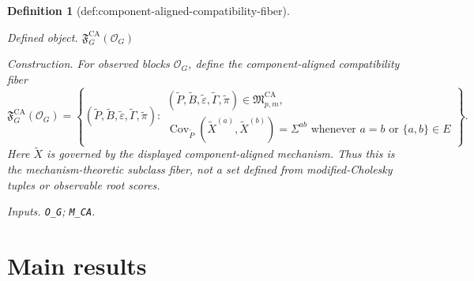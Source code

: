 \documentclass{article}
\newtheorem{definition}{Definition}
\begin{document}
\begin{definition}[def:component-aligned-compatibility-fiber]\label{def:component-aligned-compatibility-fiber}
\par\smallskip\noindent\emph{Defined object.} \(\mathfrak F_G^{\mathrm{CA}}(\mathcal O_G)\)
\par\smallskip\noindent\emph{Construction.} For observed blocks \(\mathcal O_G\), define the component-aligned compatibility fiber
\[
 \mathfrak F_G^{\mathrm{CA}}(\mathcal O_G)
 =\left\{(\widetilde P,\widetilde B,\widetilde\varepsilon,
 \widetilde\Gamma,\widetilde\pi):
 \begin{array}{l}
 (\widetilde P,\widetilde B,\widetilde\varepsilon,
 \widetilde\Gamma,\widetilde\pi)
 \in\mathfrak M_{p,m}^{\mathrm{CA}},\\
 \operatorname{Cov}_{\widetilde P}(\widetilde X^{(a)},
 \widetilde X^{(b)})=\Sigma^{ab}
 \text{ whenever }a=b\text{ or }\{a,b\}\in E
 \end{array}\right\}.
\]
Here \(\widetilde X\) is governed by the displayed component-aligned mechanism.  Thus this is the mechanism-theoretic subclass fiber, not a set defined from modified-Cholesky tuples or observable root scores.
\par\smallskip\noindent\emph{Inputs.} \texttt{O\_\allowbreak{}G}; \texttt{M\_\allowbreak{}CA}.
\end{definition}

\section{Main results}
\end{document}

